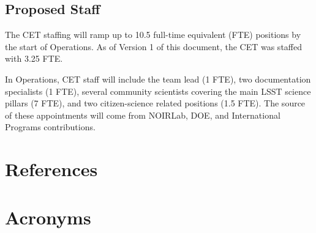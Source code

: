 \documentclass[DM,lsstdraft,toc]{lsstdoc}
\begin{document}
\subsection{Proposed Staff}

The CET staffing will ramp up to 10.5 full-time equivalent (FTE) positions by the start of Operations.
As of Version 1 of this document, the CET was staffed with 3.25 FTE.

In Operations, CET staff will include the team lead (1 FTE), two documentation specialists (1 FTE), several community scientists covering the main LSST science pillars (7 FTE), and two citizen-science related positions (1.5 FTE). 
The source of these appointments will come from NOIRLab, DOE, and International Programs contributions.



\appendix
\section{References} \label{sec:bib}
\renewcommand{\refname}{} %


\section{Acronyms} \label{sec:acronyms}

\end{document}
